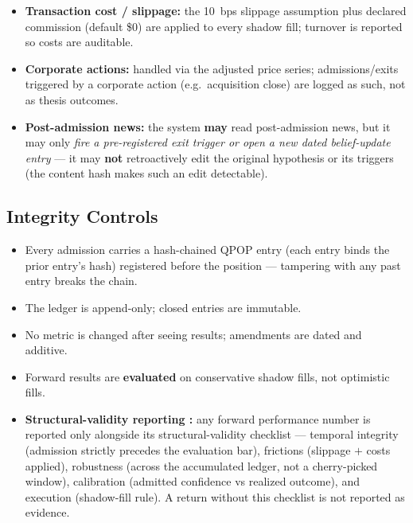 \documentclass[11pt]{article}
\begin{document}
\begin{itemize}
    print $+$ \textbf{assumed slippage (default 10 bps)}; broker paper fills validate automation
    only and are not the metric of record.
  \item \textbf{Transaction cost / slippage:} the 10~bps slippage assumption plus declared
    commission (default \$0) are applied to every shadow fill; turnover is reported so costs are
    auditable.
  \item \textbf{Corporate actions:} handled via the adjusted price series; admissions/exits
    triggered by a corporate action (e.g.\ acquisition close) are logged as such, not as thesis
    outcomes.
  \item \textbf{Post-admission news:} the system \textbf{may} read post-admission news, but it
    may only \emph{fire a pre-registered exit trigger or open a new dated belief-update entry}
    --- it may \textbf{not} retroactively edit the original hypothesis or its triggers (the
    content hash makes such an edit detectable).
\end{itemize}

\subsection*{Integrity Controls}

\begin{itemize}
  \item Every admission carries a hash-chained QPOP entry (each entry binds the prior entry's
    hash) registered before the position --- tampering with any past entry breaks the chain.
  \item The ledger is append-only; closed entries are immutable.
  \item No metric is changed after seeing results; amendments are dated and additive.
  \item Forward results are \textbf{evaluated} on conservative shadow fills, not optimistic fills.
  \item \textbf{Structural-validity reporting \citep{ye2026alphaillusion}:} any forward
    performance number is reported only alongside its structural-validity checklist ---
    temporal integrity (admission strictly precedes the evaluation bar), frictions (slippage
    $+$ costs applied), robustness (across the accumulated ledger, not a cherry-picked window),
    calibration (admitted confidence vs realized outcome), and execution (shadow-fill rule).
    A return without this checklist is not reported as evidence.
\end{itemize}
\end{document}

